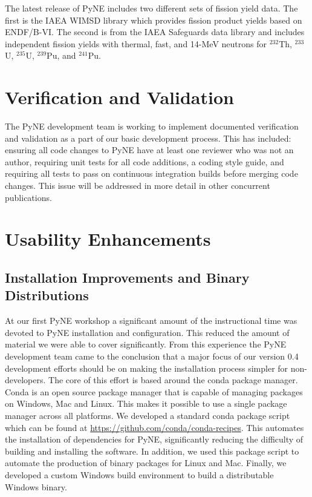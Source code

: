 \documentclass{anstrans}
\begin{document}
The latest release of PyNE includes two different sets of fission yield data. 
The first is the IAEA WIMSD library which provides fission product yields 
based on ENDF/B-VI. The second is from the IAEA Safeguards data library and includes 
independent fission yields with thermal, fast, and 14-MeV neutrons for $^{232}$Th, 
$^{233}$U, $^{235}$U, $^{239}$Pu, and $^{241}$Pu.

\section{Verification and Validation}

The PyNE development team is working to implement documented verification 
and validation as a part of our basic development process. This has included: 
ensuring all code changes to PyNE have at least one reviewer who was not an 
author, requiring unit tests for all code additions, a coding style guide, 
and requiring all tests to pass on continuous integration builds before 
merging code changes. 
This issue will be addressed in more detail in other concurrent publications.

\section{Usability Enhancements}

\subsection{Installation Improvements and Binary Distributions}
At our first PyNE workshop a significant amount of the instructional
time was devoted to PyNE installation and configuration. This reduced 
the amount of material we were able to cover significantly. From this
experience the PyNE development team came to the conclusion that a major
focus of our version 0.4 development efforts should be on making the 
installation process simpler for non-developers.
The core of this effort is based around the conda 
package manager. Conda is an open source package manager that is capable 
of managing packages on Windows, Mac and Linux. This makes it possible to use 
a single package manager across all platforms. We developed a standard conda 
package script which can be found at \url{https://github.com/conda/conda-recipes}. 
This automates the installation of dependencies for PyNE, significantly 
reducing the difficulty of building and installing the software.
In addition, we used this package script to automate the production of binary 
packages for Linux and Mac. Finally, we developed a custom Windows build 
environment to build a distributable Windows binary.
\end{document}
